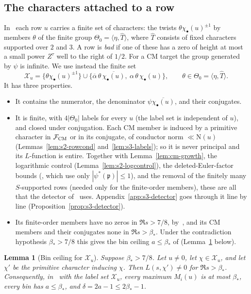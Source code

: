 \documentclass[11pt]{article}
\numberwithin{equation}{section}
\newcommand{\N}{\mathrm N}
\newtheorem{lemma}{Lemma}
\begin{document}
\subsection{The characters attached to a row}
In~\cite{OAI78} each row $u$ carries a finite set of characters: the twists
$\theta\chi_\bullet(u)^{\pm1}$ by members $\theta$ of the finite group
$\Theta_0=\langle\eta,\widehat T\rangle$, where $\widehat T$ consists of fixed characters
supported over $2$ and $3$. A row is \emph{bad} if one of these has a zero of height at most a small
power $Z^\tau$ well to the right of $1/2$. For a CM target the group generated by $\psi$ is
infinite. We use instead the finite set
\begin{equation}\label{eq:d079}
 \mathcal X_u=\bigl\{\theta\chi_\bullet(u)^{\pm1}\bigr\}\cup
 \bigl\{\overline\alpha\,\theta\,\overline{\chi_\bullet(u)},\ \alpha\,\theta\,\chi_\bullet(u)\bigr\},
 \qquad\theta\in\Theta_0=\langle\eta,\widehat T\rangle .
\end{equation}
It has three properties.
\begin{itemize}
\item It contains the numerator, the denominator $\psi\overline{\chi_\bullet(u)}$, and their
 conjugates.
\item It is finite, with $4|\Theta_0|$ labels for every $u$ (the label set is independent of $u$), and closed
 under conjugation. Each CM member is induced by a primitive character in $\mathcal F_{\rm CM}$ or in its
 conjugate, of conductor norm $\ll\N(u)$ (Lemmas~\ref{lem:s2-rowcond} and~\ref{lem:s3-labels}); so it is never
 principal and its $L$-function is entire. Together with Lemma~\ref{lem:cm-growth}, the logarithmic control
 (Lemma~\ref{lem:s2-logcontrol}), the deleted-Euler-factor bounds
 (\cite[Lemma~4.10]{OAI78}, which use only $|\psi^*(\mathfrak p)|\le1$), and the removal of the
 finitely many $S$-supported rows (needed only for the finite-order members), these are all that the detector
 of~\cite[Section~8]{OAI78} uses. Appendix~\ref{app:s3-detector} goes through it line by line
 (Proposition~\ref{prop:s3-detector}).
\item Its finite-order members have no zeros in $\Re s>7/8$, by~\cite[Theorem~1.1]{OAI78}, and its CM
 members and their conjugates none in $\Re s>\beta_*$. Under the contradiction hypothesis $\beta_*>7/8$ this gives
 the bin ceiling $a\le\beta_*$ of \cite[\S3.3]{G78} (Lemma~\ref{lem:r3-ceiling} below).
\end{itemize}
\begin{lemma}[Bin ceiling for $\mathcal X_u$]\label{lem:r3-ceiling}
Suppose $\beta_*>7/8$. Let $u\ne0$, let $\chi\in\mathcal X_u$, and let $\chi'$ be the primitive character inducing
$\chi$. Then $L(s,\chi')\ne0$ for $\Re s>\beta_*$. Consequently, in~\cite[Lemma~8.1]{OAI78} with the
label set $\mathcal X_u$, every maximum $M_i(u)$ is at most $\beta_*$, every bin has $a\le\beta_*$, and
$\delta=2a-1\le2\beta_*-1$.
\end{lemma}
\end{document}
